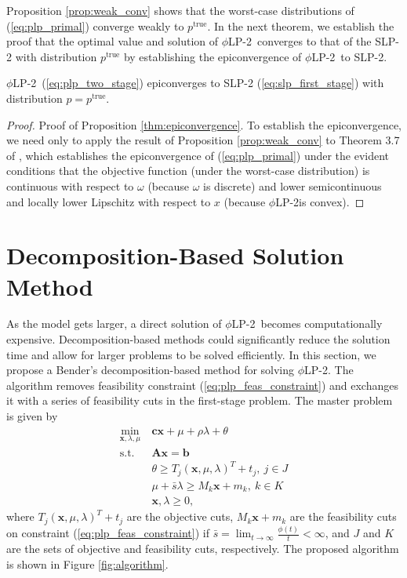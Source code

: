 \documentclass[ijoc,letterpaper]{informs3} %
\newcommand{\x}{\mathbf{x}}
\renewcommand{\c}{\mathbf{c}}
\newcommand{\A}{\mathbf{A}}
\renewcommand{\b}{\mathbf{b}}
\newcommand{\ptrue}{p^{\text{true}}}
\newcommand{\st}{\mbox{s.t.}}
\newcommand{\plp}{$\phi$LP-2}
\begin{document}
Proposition \ref{prop:weak_conv} shows that the worst-case distributions of (\ref{eq:plp_primal}) converge weakly to $\ptrue$.
In the next theorem, we establish the proof that the optimal value and solution of \plp\ converges to that of the SLP-2 with distribution $\ptrue$ by establishing the epiconvergence of \plp\ to SLP-2.
\begin{theorem}
	\label{thm:epiconvergence}
	\plp\ (\ref{eq:plp_two_stage}) epiconverges to SLP-2 (\ref{eq:slp_first_stage}) with distribution $p = \ptrue$.
\end{theorem}

\begin{proof}{\sc Proof of Proposition \ref{thm:epiconvergence}.}
	To establish the epiconvergence, we need only to apply the result of Proposition \ref{prop:weak_conv} to Theorem 3.7 of \cite{dupacova1988asymptotic}, which establishes the epiconvergence of (\ref{eq:plp_primal}) under the evident conditions that the objective function (under the worst-case distribution) is continuous with respect to $\omega$ (because $\omega$ is discrete) and lower semicontinuous and locally lower Lipschitz with respect to $x$ (because \plp is convex).
	\Halmos
\end{proof}

\section{Decomposition-Based Solution Method}
\label{sec:soln_algorithm}

As the model gets larger, a direct solution of \plp\ becomes computationally expensive. 
Decomposition-based methods could significantly reduce the solution time and allow for larger problems to be solved efficiently. In this section, we propose a Bender's decomposition-based method for solving \plp.
The algorithm removes feasibility constraint (\ref{eq:plp_feas_constraint})  and exchanges it with a series of feasibility cuts in the first-stage problem.
The master problem is given by
\begin{align}
	\min_{\x,\lambda,\mu} \ & \c\x + \mu + \rho \lambda + \theta \label{eq:master_problem}\\
	\st \ & \A\x = \b \nonumber \\
	& \theta \geq T_j (\x,\mu,\lambda)^T + t_j, \ j \in J \nonumber \\
	& \mu + \bar{s}\lambda \geq M_k \x + m_k, \ k \in K \nonumber \\
	& \x,\lambda \geq 0, \nonumber
\end{align}
where $T_j (\x,\mu,\lambda)^T + t_j$ are the objective cuts, $M_k \x + m_k$ are the feasibility cuts on constraint (\ref{eq:plp_feas_constraint}) if $\bar{s} = \lim_{t \rightarrow \infty} \frac{\phi(t)}{t} < \infty$, and $J$ and $K$ are the sets of objective and feasibility cuts, respectively.
The proposed algorithm is shown in Figure \ref{fig:algorithm}.
\end{document}
